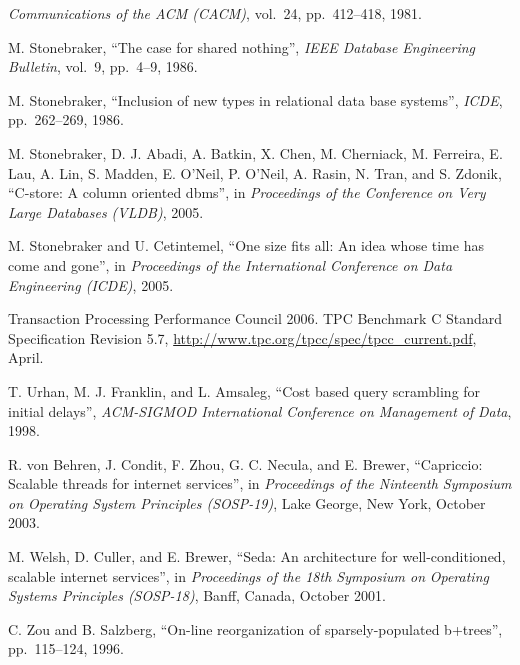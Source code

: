 \documentclass[b5paper,11pt,twoside,openright]{book}
\begin{document}
\begin{enumerate}[label={[\arabic*]}]
  \emph{Communications of the ACM (CACM)}, vol.~24, pp.~412--418, 1981.
\item
  M. Stonebraker, ``The case for shared nothing'', \emph{IEEE Database
  Engineering} \emph{Bulletin}, vol.~9, pp.~4--9, 1986.
\item
  M. Stonebraker, ``Inclusion of new types in relational data base
  systems'', \emph{ICDE}, pp.~262--269, 1986.
\item
  M. Stonebraker, D. J. Abadi, A. Batkin, X. Chen, M. Cherniack, M.
  Ferreira, E. Lau, A. Lin, S. Madden, E. O'Neil, P. O'Neil, A. Rasin,
  N. Tran, and S. Zdonik, ``C-store: A column oriented dbms'', in \emph{Proceedings
of the Conference on Very Large Databases (VLDB)}, 2005.
\item
  M. Stonebraker and U. Cetintemel, ``One size fits all: An idea whose
  time has come and gone'', in \emph{Proceedings of the International
  Conference on Data} \emph{Engineering (ICDE)}, 2005.
\item
  Transaction Processing Performance Council 2006. TPC Benchmark C
  Standard Specification Revision 5.7, \url{http://www.tpc.org/tpcc/spec/tpcc\_current.pdf}, April.
\item
  T. Urhan, M. J. Franklin, and L. Amsaleg, ``Cost based query
  scrambling for initial delays'', \emph{ACM-SIGMOD International
  Conference on Management of} \emph{Data}, 1998.
\item
  R. von Behren, J. Condit, F. Zhou, G. C. Necula, and E. Brewer,
  ``Capriccio: Scalable threads for internet services'', in
  \emph{Proceedings of the Ninteenth Symposium on Operating System
  Principles (SOSP-19)}, Lake George, New York, October 2003.
\item
  M. Welsh, D. Culler, and E. Brewer, ``Seda: An architecture for well-conditioned,
  scalable internet services'', in \emph{Proceedings of the
  18th Symposium on} \emph{Operating Systems Principles (SOSP-18)},
  Banff, Canada, October 2001.
\item
  C. Zou and B. Salzberg, ``On-line reorganization of sparsely-populated
  b+trees'', pp.~115--124, 1996.
\end{enumerate}
\end{document}
